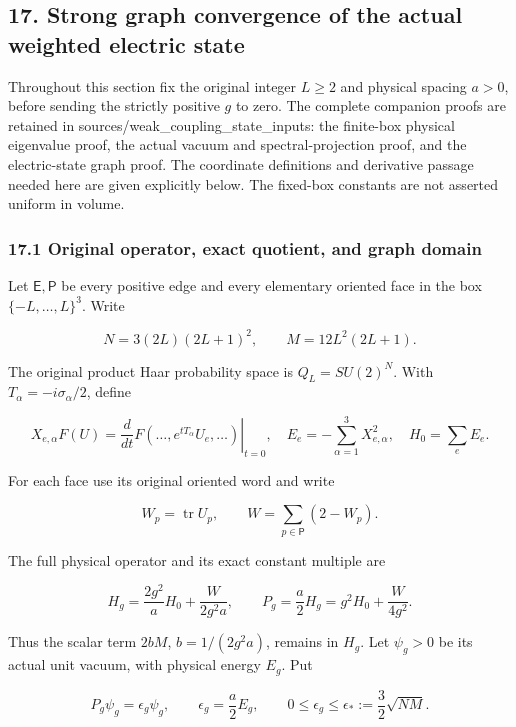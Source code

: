 \documentclass[
  11pt,
]{article}
\begin{document}
\subsection{17. Strong graph convergence of the actual weighted electric
state}\label{strong-graph-convergence-of-the-actual-weighted-electric-state}

Throughout this section fix the original integer \(L\ge2\) and physical
spacing \(a>0\), before sending the strictly positive \(g\) to zero. The
complete companion proofs are retained in
sources/weak\_coupling\_state\_inputs: the finite-box physical
eigenvalue proof, the actual vacuum and spectral-projection proof, and
the electric-state graph proof. The coordinate definitions and
derivative passage needed here are given explicitly below. The fixed-box
constants are not asserted uniform in volume.

\subsubsection{17.1 Original operator, exact quotient, and graph
domain}\label{original-operator-exact-quotient-and-graph-domain}

Let \(\mathsf E,\mathsf P\) be every positive edge and every elementary
oriented face in the box \(\{-L,\ldots,L\}^3\). Write

\[
 N=3(2L)(2L+1)^2,\qquad M=12L^2(2L+1).
\]

The original product Haar probability space is \(Q_L=SU(2)^N\). With
\(T_\alpha=-i\sigma_\alpha/2\), define

\[
 X_{e,\alpha}F(U)
 =\left.\frac{d}{dt}F(\ldots,e^{tT_\alpha}U_e,\ldots)\right|_{t=0},
 \quad E_e=-\sum_{\alpha=1}^3X_{e,\alpha}^2,\quad H_0=\sum_eE_e.
\]

For each face use its original oriented word and write

\[
 W_p=\operatorname{tr}U_p,\qquad
 W=\sum_{p\in\mathsf P}(2-W_p).
\]

The full physical operator and its exact constant multiple are

\[
 H_g=\frac{2g^2}{a}H_0+\frac{W}{2g^2a},\qquad
 P_g=\frac a2H_g=g^2H_0+\frac{W}{4g^2}.
\tag{190}
\]

Thus the scalar term \(2bM\), \(b=1/(2g^2a)\), remains in \(H_g\). Let
\(\psi_g>0\) be its actual unit vacuum, with physical energy \(E_g\).
Put

\[
 P_g\psi_g=\epsilon_g\psi_g,\qquad
 \epsilon_g=\frac a2E_g,\qquad
 0\le\epsilon_g\le\epsilon_*:=\frac32\sqrt{NM}.
\tag{191}
\]
\end{document}
